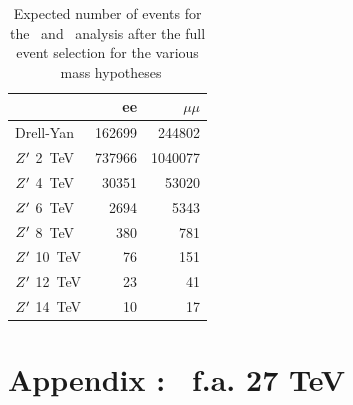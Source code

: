 \begin{table}[!htb]
   \centering
\begin{tabular}{|l|r|r|}
  \hline
  \hline
 & ee & $\mu\mu$  \\
  \hline
  Drell-Yan    & 162699 &  244802 \\
  \hline
  $Z^{\prime}$ 2~TeV  & 737966 & 1040077 \\
  $Z^{\prime}$ 4~TeV  &  30351 &   53020 \\
  $Z^{\prime}$ 6~TeV  &   2694 &    5343 \\
  $Z^{\prime}$ 8~TeV  &    380 &     781 \\
  $Z^{\prime}$ 10~TeV &     76 &     151 \\
  $Z^{\prime}$ 12~TeV &     23 &      41 \\
  $Z^{\prime}$ 14~TeV &     10 &      17 \\
  \hline
  \hline
\end{tabular}
  \caption{Expected number of events for the \Zpee\ and \Zpmumu\ analysis after the full event selection for the various \Zp\ mass hypotheses}
  \label{tab:leptonicresonances27:yieldsll}
\end{table}

\clearpage
\newpage

\section{Appendix :  \texorpdfstring{\Zpmumu}{zpmm}\ f.a. 27 TeV}
\label{appendix:zpmumufalvano27}

